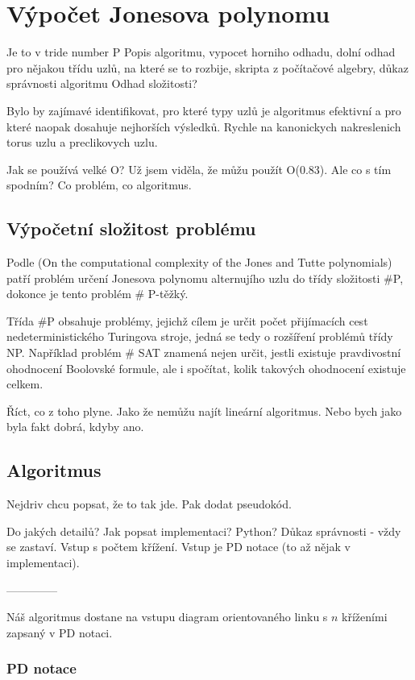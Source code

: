 \chapter{Výpočet Jonesova polynomu}


Je to v tride number P  
Popis algoritmu, vypocet horniho odhadu, dolní odhad pro nějakou třídu uzlů, na které se to rozbije, skripta z počítačové algebry, důkaz správnosti algoritmu
Odhad složitosti?


Bylo by zajímavé identifikovat, pro které typy uzlů je algoritmus efektivní a pro které naopak dosahuje nejhorších výsledků.
Rychle na kanonickych nakreslenich torus uzlu a preclikovych uzlu.

Jak se používá velké O?
Už jsem viděla, že můžu použít O(0.83). Ale co s tím spodním?
Co problém, co algoritmus.

\section{Výpočetní složitost problému}

Podle (On the computational complexity of the Jones and Tutte polynomials) patří problém určení Jonesova polynomu alternujího uzlu do třídy složitosti \#P, dokonce je tento problém \# P-těžký. 

Třída \#P obsahuje problémy, jejichž cílem je určit počet přijímacích cest nedeterministického Turingova stroje, jedná se tedy o rozšíření problémů třídy NP. Například problém \# SAT znamená nejen určit, jestli existuje pravdivostní ohodnocení Boolovské formule, ale i spočítat, kolik takových ohodnocení existuje celkem.

Říct, co z toho plyne. Jako že nemůžu najít lineární algoritmus. Nebo bych jako byla fakt dobrá, kdyby ano.

\section{Algoritmus}
Nejdriv chcu popsat, že to tak jde. Pak dodat pseudokód.

Do jakých detailů? Jak popsat implementaci? Python? Důkaz správnosti - vždy se zastaví. Vstup s počtem křížení. Vstup je PD notace (to až nějak v implementaci).

--------------

Náš algoritmus dostane na vstupu diagram orientovaného linku s $n$ kříženími zapsaný v PD notaci.

\subsection{PD notace} 

